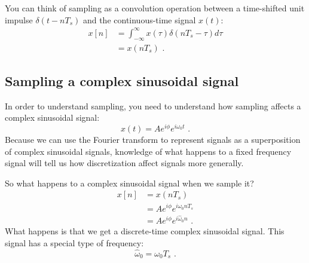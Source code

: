  You can think of sampling as a convolution operation between a
  time-shifted unit impulse $\delta(t-nT_s)$ and the continuous-time
  signal $x(t)$:
  \begin{align}
    x[n] & = \int_{-\infty}^{\infty} x(\tau) \delta(n T_s - \tau)  d\tau \\
         & = x(n T_s)\,\,.
  \end{align}
\fi

\subsection{Sampling a complex sinusoidal signal}
In order to understand sampling, you need to understand how sampling affects a complex sinusoidal signal:
\begin{equation}
  x(t)=A e^{i\phi} e^{i\omega_0 t}\,\,.
\end{equation}
Because we can use the Fourier transform to represent signals as a superposition of complex 
sinusoidal signals, knowledge of what happens to a fixed frequency signal will tell us how 
discretization affect signals more generally.

\begin{marginfigure}
  \begin{center}
  \end{center}
\end{marginfigure}

So what happens to a complex sinusoidal signal when we sample it?
\begin{align}
  x[n] & =x(nT_s)                                \\
       & =A e^{i\phi} e^{i\omega_0 n T_s }       \\
       & =A e^{i\phi} e^{i\hat{\omega}_0 n}\,\,.
\end{align}
What happens is that we get a discrete-time complex sinusoidal signal. This signal has a special type of frequency:
\begin{equation}
  \boxed{
    \hat{\omega}_0 = \omega_0 T_s
  }\,\,.
\end{equation}

